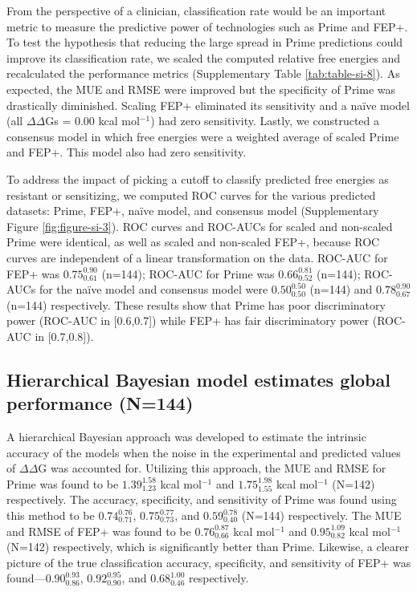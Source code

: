 \documentclass[phd,tocprelim]{cornell}
\renewcommand{\FIG}[1]{\autoref{fig:#1}}
\begin{document}
From the perspective of a clinician, classification rate would be an important metric to measure the predictive power of technologies such as Prime and FEP+. To test the hypothesis that reducing the large spread in Prime predictions could improve its classification rate, we scaled the computed relative free energies %
and recalculated the performance metrics (Supplementary Table \ref{tab:table-si-8}). As expected, the MUE and RMSE were improved but the specificity of Prime was drastically diminished. %
Scaling FEP+ eliminated its sensitivity and a na{\"i}ve model (all $\Delta\Delta$Gs = 0.00 kcal mol$^{-1}$) had zero sensitivity. Lastly, we constructed a consensus model in which free energies were a weighted average of scaled Prime and FEP+. This model also had zero sensitivity. %

To address the impact of picking a cutoff to classify predicted free energies as resistant or sensitizing, we computed ROC curves for the various predicted datasets: Prime, FEP+, na{\"i}ve model, and consensus model (Supplementary Figure \ref{fig:figure-si-3}). ROC curves and ROC-AUCs for scaled and non-scaled Prime were identical, as well as scaled and non-scaled FEP+, because ROC curves are independent of a linear transformation on the data. %
ROC-AUC for FEP+ was $0.75_{0.61}^{0.90}$ (n=144); ROC-AUC for Prime was $0.66_{0.52}^{0.81}$ (n=144); ROC-AUCs for the na{\"i}ve model and consensus model were $0.50_{0.50}^{0.50}$ (n=144) and $0.78_{0.67}^{0.90}$ (n=144) respectively. These results show that Prime has poor discriminatory power (ROC-AUC in [0.6,0.7]) while FEP+ has fair discriminatory power (ROC-AUC in [0.7,0.8]).


\subsection{Hierarchical Bayesian model estimates global performance (N=144)}
A hierarchical Bayesian approach was developed to estimate the intrinsic accuracy of the models when the noise in the experimental and predicted values of $\Delta\Delta$G was accounted for.
Utilizing this approach, the MUE and RMSE for Prime was found to be $1.39^{1.58}_{1.23}$ kcal mol$^{-1}$ and $1.75^{1.98}_{1.55}$ kcal mol$^{-1}$ (N=142) respectively.
The accuracy, specificity, and sensitivity of Prime was found using this method to be $0.74^{0.76}_{0.71}$, $0.75^{0.77}_{0.73}$, and $0.59^{0.78}_{0.40}$ (N=144) respectively.
The MUE and RMSE of FEP+ was found to be $0.76^{0.87}_{0.66}$ kcal mol$^{-1}$ and $0.95^{1.09}_{0.82}$ kcal mol$^{-1}$ (N=142) respectively, which is significantly better than Prime.
Likewise, a clearer picture of the true classification accuracy, specificity, and sensitivity of FEP+ was found---$0.90^{0.93}_{0.86}$, $0.92^{0.95}_{0.90}$, and $0.68^{1.00}_{0.46}$ respectively.
\end{document}
